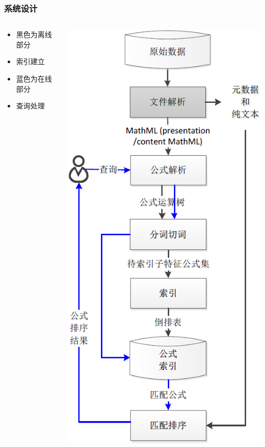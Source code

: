 \documentclass[17pt]{beamer}
\begin{document}
    \begin{frame}
        \frametitle{系统设计}
        \vspace{-5cm} %
        \begin{columns}
                \begin{center}
                    \begin{itemize}
                        \item 黑色为离线部分
                        \item[] 索引建立 %
                        \item 蓝色为在线部分
                        \item[] 查询处理
                    \end{itemize}
                \end{center}
                \includegraphics[height=0.8\textheight]{pic/process.png}
        \end{columns}
    \end{frame}
\end{document}

